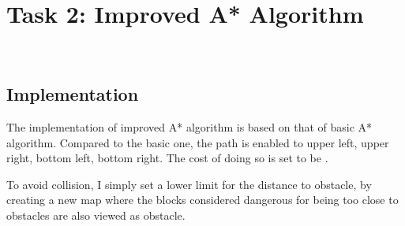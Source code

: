 \documentclass[aps,letterpaper,10pt]{revtex4}
\begin{document}


\newpage
\section{Task 2: Improved A* Algorithm}
\begin{figure}[H]
	  \centering
	  \\
	  \caption{}
	  \label{fig:oscil}
	\end{figure}

\subsection{Implementation}
The implementation of improved A* algorithm is based on that of basic A* algorithm. Compared to the basic one, the path is enabled to upper left, upper right, bottom left, bottom right. The cost of doing so is set to be  .
\vspace{5mm}
	
	\vspace{3mm}

\vspace{3mm} 
To avoid collision, I simply set a lower limit for the distance to obstacle, by creating a new map where the blocks considered dangerous for being too close to obstacles are also viewed as obstacle.
\end{document}
